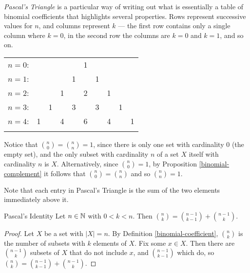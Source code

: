 \begin{defn}\label{pascals-triangle}
    \emph{Pascal's Triangle} is a particular way of writing out what is essentially a table of binomial coefficients that highlights several properties. Rows represent successive values for $n$, and columns represent $k$ --- the first row contains only a single column where $k=0$, in the second row the columns are $k=0$ and $k=1$, and so on.
    \begin{center}
        \begin{tabular}{rccccccccc}
            $n=0$:&    &    &    &    &  1\\\noalign{\smallskip\smallskip}
            $n=1$:&    &    &    &  1 &    &  1\\\noalign{\smallskip\smallskip}
            $n=2$:&    &    &  1 &    &  2 &    &  1\\\noalign{\smallskip\smallskip}
            $n=3$:&    &  1 &    &  3 &    &  3 &    &  1\\\noalign{\smallskip\smallskip}
            $n=4$:&  1 &    &  4 &    &  6 &    &  4 &    &  1\\\noalign{\smallskip\smallskip}
        \end{tabular}
    \end{center}
\end{defn}

\begin{rmk}
    Notice that $\binom{n}{0} = \binom{n}{n} = 1$, since there is only one set with cardinality $0$ (the empty set), and the only subset with cardinality $n$ of a set $X$ itself with cardinality $n$ is $X$. Alternatively, since $\binom{n}{0} = 1$, by Proposition \ref{binomial-complement} it follows that $\binom{n}{0} = \binom{n}{n}$ and so $\binom{n}{n} = 1$.
\end{rmk}

\begin{rmk}
    Note that each entry in Pascal's Triangle is the sum of the two elements immediately above it.
\end{rmk}

\begin{prop}{Pascal's Identity}\label{pascals-identity}
    Let $n \in \mathbb{N}$ with $0 < k < n$. Then $\binom{n}{k} = \binom{n-1}{k-1} + \binom{n-1}{k}$.
\end{prop}

\begin{proof}
    Let $X$ be a set with $|X| = n$. By Definition \ref{binomial-coefficient}, $\binom{n}{k}$ is the number of subsets with $k$ elements of $X$. Fix some $x \in X$. Then there are $\binom{n-1}{k}$ subsets of $X$ that do not include $x$, and $\binom{n-1}{k-1}$ which do, so $\binom{n}{k} = \binom{n-1}{k-1} + \binom{n-1}{k}$.
\end{proof}

